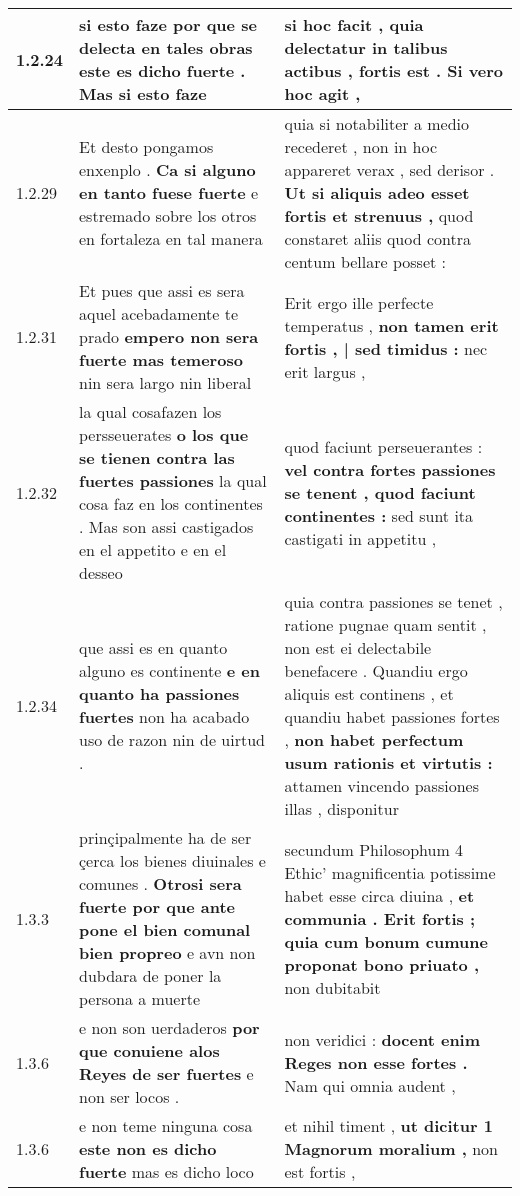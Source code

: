 \begin{tabular}{|p{1cm}|p{6.5cm}|p{6.5cm}|}
1.2.24 & si esto faze \textbf{ por que se delecta en tales obras este es dicho fuerte . } Mas si esto faze & si hoc facit , \textbf{ quia delectatur in talibus actibus , fortis est . } Si vero hoc agit , \\\hline
1.2.29 & Et desto pongamos enxenplo . \textbf{ Ca si alguno en tanto fuese fuerte } e estremado sobre los otros en fortaleza en tal manera & quia si notabiliter a medio recederet , non in hoc appareret verax , sed derisor . \textbf{ Ut si aliquis adeo esset fortis et strenuus , } quod constaret aliis quod contra centum bellare posset : \\\hline
1.2.31 & Et pues que assi es sera aquel acebadamente te prado \textbf{ empero non sera fuerte mas temeroso } nin sera largo nin liberal & Erit ergo ille perfecte temperatus , \textbf{ non tamen erit fortis , | sed timidus : } nec erit largus , \\\hline
1.2.32 & la qual cosafazen los persseuerates \textbf{ o los que se tienen contra las fuertes passiones } la qual cosa faz en los continentes . Mas son assi castigados en el appetito e en el desseo & quod faciunt perseuerantes : \textbf{ vel contra fortes passiones se tenent , quod faciunt continentes : } sed sunt ita castigati in appetitu , \\\hline
1.2.34 & que assi es en quanto alguno es continente \textbf{ e en quanto ha passiones fuertes } non ha acabado uso de razon nin de uirtud . & quia contra passiones se tenet , ratione pugnae quam sentit , non est ei delectabile benefacere . Quandiu ergo aliquis est continens , et quandiu habet passiones fortes , \textbf{ non habet perfectum usum rationis et virtutis : } attamen vincendo passiones illas , disponitur \\\hline
1.3.3 & prinçipalmente ha de ser çerca los bienes diuinales e comunes . \textbf{ Otrosi sera fuerte por que ante pone el bien comunal bien propreo } e avn non dubdara de poner la persona a muerte & secundum Philosophum 4 Ethic’ magnificentia potissime habet esse circa diuina , \textbf{ et communia . Erit fortis ; quia cum bonum cumune proponat bono priuato , } non dubitabit \\\hline
1.3.6 & e non son uerdaderos \textbf{ por que conuiene alos Reyes de ser fuertes } e non ser locos . & non veridici : \textbf{ docent enim Reges non esse fortes . } Nam qui omnia audent , \\\hline
1.3.6 & e non teme ninguna cosa \textbf{ este non es dicho fuerte } mas es dicho loco & et nihil timent , \textbf{ ut dicitur 1 Magnorum moralium , } non est fortis , \\\hline

\end{tabular}
